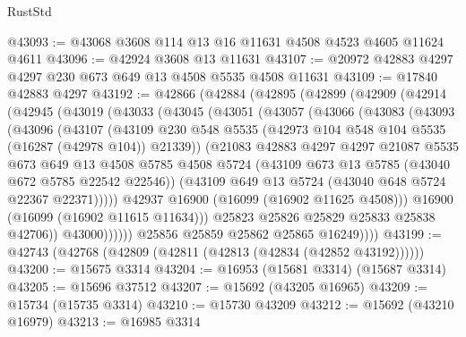 \begin{lexlean}{RustStd}
\begin{coremodule}
@43093 := @43068 @3608 @114 @13 @16 @11631 @4508 @4523 @4605 @11624 @4611
@43096 := @42924 @3608 @13 @11631
@43107 := @20972 @42883 @4297 @4297 @230 @673 @649 @13 @4508 @5535 @4508 @11631
@43109 := @17840 @42883 @4297
@43192 := @42866
    (@42884
      (@42895
        (@42899
          (@42909
            (@42914
              (@42945
                (@43019
                  (@43033
                    (@43045
                      (@43051
                        (@43057
                          (@43066
                            (@43083
                              (@43093
                                (@43096
                                  (@43107
                                    (@43109
                                      @230
                                      @548
                                      @5535
                                      (@42973 @104 @548 @104 @5535 (@16287 (@42978 @104)) @21339))
                                    (@21083
                                      @42883
                                      @4297
                                      @4297
                                      @21087
                                      @5535
                                      @673
                                      @649
                                      @13
                                      @4508
                                      @5785
                                      @4508
                                      @5724
                                      (@43109 @673 @13 @5785 (@43040 @672 @5785 @22542 @22546))
                                      (@43109 @649 @13 @5724 (@43040 @648 @5724 @22367 @22371)))))
                                @42937
                                @16900
                                (@16099 (@16902 @11625 @4508)))
                              @16900
                              (@16099 (@16902 @11615 @11634)))
                            @25823
                            @25826
                            @25829
                            @25833
                            @25838
                            @42706))
                        @43000))))))
            @25856
            @25859
            @25862
            @25865
            @16249))))
@43199 := @42743 (@42768 (@42809 (@42811 (@42813 (@42834 (@42852 @43192))))))
@43200 := @15675 @3314
@43204 := @16953 (@15681 @3314) (@15687 @3314)
@43205 := @15696 @37512
@43207 := @15692 (@43205 @16965)
@43209 := @15734 (@15735 @3314)
@43210 := @15730 @43209
@43212 := @15692 (@43210 @16979)
@43213 := @16985 @3314

\end{coremodule}
\end{lexlean}

